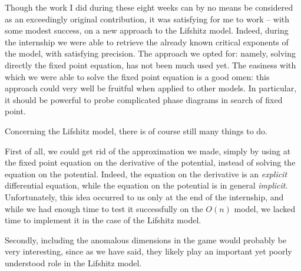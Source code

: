 Though the work I did during these eight weeks can by no means be considered as an exceedingly original contribution, it was satisfying for me to work -- with some modest success, on a new approach to the Lifshitz model. 
Indeed, during the internship we were able to retrieve the already known critical exponents of the model, with satisfying precision. The approach we opted for: namely, solving directly the fixed point equation, has not been much used yet. The easiness with which we were able to solve the fixed point equation is a good omen: this approach could very well be fruitful when applied to other models. In particular, it should be powerful to probe complicated phase diagrams in search of fixed point.


Concerning the Lifshitz model, there is of course still many things to do. 

First of all, we could get rid of the approximation we made, simply by using at the fixed point equation on the derivative of the potential, instead of solving the equation on the potential. Indeed, the equation on the derivative is an \textit{explicit} differential equation, while the equation on the potential is in general \textit{implicit}. Unfortunately, this idea occurred to us only at the end of the internship, and while we had enough time to test it successfully on the $O(n)$ model,  we lacked time to implement it in the case of the Lifshitz model.

Secondly, including the anomalous dimensions in the game would probably be very interesting, since as we have said, they likely play an important yet poorly understood role in the Lifshitz model.